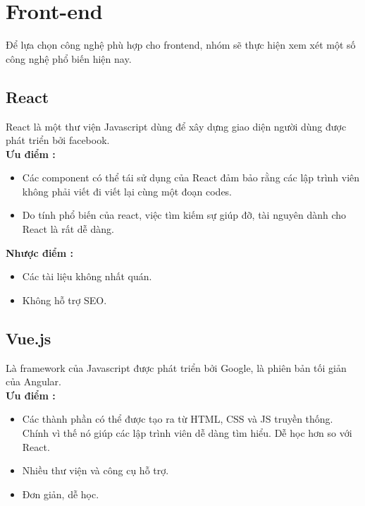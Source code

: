 
\section{Front-end}
Để lựa chọn công nghệ phù hợp cho frontend, nhóm sẽ thực hiện xem xét một số công nghệ phổ biến hiện nay.

\subsection{React}
\hspace*{0.5cm} React là một thư viện Javascript dùng để xây dựng giao diện người dùng được phát triển bởi facebook.\\

\textbf{Ưu điểm \cite{technologyFE}:}
\begin{itemize}
    \item Các component có thể tái sử dụng của React đảm bảo rằng các lập trình viên không phải viết đi viết lại cùng một đoạn codes.
    \item Do tính phổ biến của react, việc tìm kiếm sự giúp đỡ, tài nguyên dành cho React là rất dễ dàng.
\end{itemize}

\textbf{Nhược điểm \cite{technologyFE}:}
\begin{itemize}
    \item Các tài liệu không nhất quán.
    \item Không hỗ trợ SEO.
\end{itemize}

\subsection{Vue.js}

\hspace*{0.5cm} Là framework của Javascript được phát triển bởi Google, là phiên bản tối giản của Angular.    \\


\textbf{Ưu điểm \cite{technologyFE}:}
\begin{itemize}
    \item Các thành phần có thể được tạo ra từ HTML, CSS và JS truyền thống. Chính vì thế nó giúp các lập trình viên dễ dàng tìm hiểu. Dễ học hơn so với React.
    \item Nhiều thư viện và công cụ hỗ trợ.
    \item Đơn giản, dễ học.
\end{itemize}

